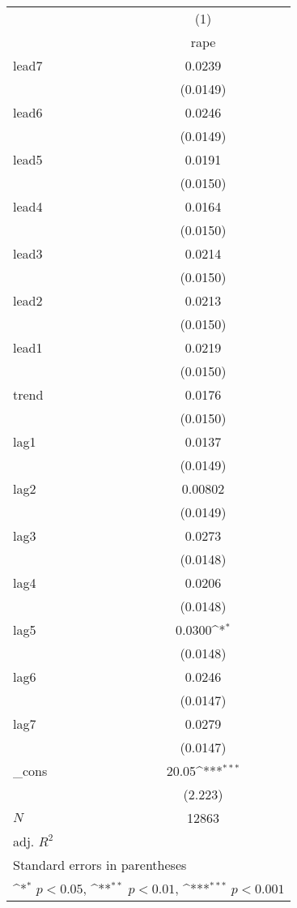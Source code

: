 {
\def\sym#1{\ifmmode^{#1}\else\(^{#1}\)\fi}
\begin{tabular}{l*{1}{c}}
\hline\hline
            &\multicolumn{1}{c}{(1)}\\
            &\multicolumn{1}{c}{rape}\\
\hline
lead7       &      0.0239         \\
            &    (0.0149)         \\
[1em]
lead6       &      0.0246         \\
            &    (0.0149)         \\
[1em]
lead5       &      0.0191         \\
            &    (0.0150)         \\
[1em]
lead4       &      0.0164         \\
            &    (0.0150)         \\
[1em]
lead3       &      0.0214         \\
            &    (0.0150)         \\
[1em]
lead2       &      0.0213         \\
            &    (0.0150)         \\
[1em]
lead1       &      0.0219         \\
            &    (0.0150)         \\
[1em]
trend       &      0.0176         \\
            &    (0.0150)         \\
[1em]
lag1        &      0.0137         \\
            &    (0.0149)         \\
[1em]
lag2        &     0.00802         \\
            &    (0.0149)         \\
[1em]
lag3        &      0.0273         \\
            &    (0.0148)         \\
[1em]
lag4        &      0.0206         \\
            &    (0.0148)         \\
[1em]
lag5        &      0.0300\sym{*}  \\
            &    (0.0148)         \\
[1em]
lag6        &      0.0246         \\
            &    (0.0147)         \\
[1em]
lag7        &      0.0279         \\
            &    (0.0147)         \\
[1em]
\_cons      &       20.05\sym{***}\\
            &     (2.223)         \\
\hline
\(N\)       &       12863         \\
adj. \(R^{2}\)&                     \\
\hline\hline
\multicolumn{2}{l}{\footnotesize Standard errors in parentheses}\\
\multicolumn{2}{l}{\footnotesize \sym{*} \(p<0.05\), \sym{**} \(p<0.01\), \sym{***} \(p<0.001\)}\\
\end{tabular}
}
